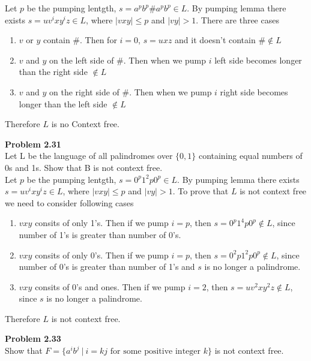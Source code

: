 \documentclass{article}
\newcommand{\problem}[1]{\large{\textbf{Problem #1} \\}}
\begin{document}
Let $p$ be the pumping lentgth, $s = a^p b ^p \# a^p b^p \in L$. By pumping lemma 
there exists $s = uv^ixy^iz \in L$, where $|vxy| \leq p$ and $|vy| > 1$. There are three
cases
\begin{enumerate}[\underline{Case} 1., leftmargin = 1.5cm]
\itemsep0em
\item $v$ or $y$ contain $\#$. Then for $i = 0$, $s = uxz$ and it doesn't contain $\# \notin L$
\item $v$ and $y$ on the left side of $\#$. Then when we pump $i$ left side becomes longer than the right side $\notin L$
\item $v$ and $y$ on the right side of $\#$. Then when we pump $i$ right side becomes longer than the left side $\notin L$
\end{enumerate}

Therefore $L$ is no Context free.

\vspace{0.4cm}
\problem{2.31}
Let L be the language of all palindromes over $\{0,1\}$ containing equal numbers of 0s and 1s. 
Show that B is not context free. \\

Let $p$ be the pumping lentgth, $s = 0^p 1^2p 0^p \in L$. By pumping lemma 
there exists $s = uv^ixy^iz \in L$, where $|vxy| \leq p$ and $|vy| > 1$. To prove
that $L$ is not context free we need to consider following cases \\

\begin{enumerate}[\underline{Case} 1., leftmargin = 1.5cm]
\itemsep0em
\item $vxy$ consits of only 1's. Then if we pump $i = p$, then $s = 0^p 1^4p 0^p \notin L$, since
number of 1's is greater than number of 0's.
\item $vxy$ consits of only 0's. Then if we pump $i = p$, then $s = 0^2p 1^2p 0^p \notin L$, since
number of 0's is greater than number of 1's and $s$ is no longer a palindrome.
\item $vxy$ consits of 0's and ones. Then if we pump $i = 2$, then $s = u v^2 x y^2 z \notin L$, since
$s$ is no longer a palindrome.
\end{enumerate}

Therefore $L$ is not context free.

\vspace{0.4cm}
\problem{2.33}
Show that $F = \{a^i b^j\: |\: i = kj\text{ for some positive integer } k\}$ is not context free. \\
\end{document}
